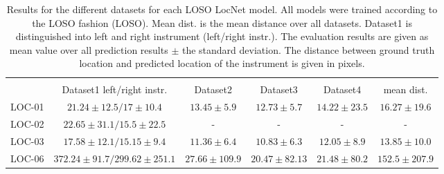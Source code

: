 \begin{table}
\begin{adjustbox}{center=\textwidth}
\begin{tabular}{l c c c c c}
\hline\noalign{\smallskip}
\multicolumn{6}{c}{\textbf{Localization Results Datasets LOSO}} \\
 & Dataset1 left/right instr. & Dataset2 & Dataset3 & Dataset4 & mean dist.\\
\hline\noalign{\smallskip}
LOC-01 & $21.24 \pm 12.5 / 17 \pm 10.4$ & $13.45 \pm 5.9$ & $12.73 \pm 5.7$ & $14.22 \pm 23.5$ & $16.27 \pm 19.6$ \\
LOC-02 & $22.65 \pm 31.1 / 15.5 \pm 22.5$ & - & - & - & - \\
LOC-03 &  $\mathbf{17.58 \pm 12.1 / 15.15 \pm 9.4}$ & $\mathbf{11.36 \pm 6.4}$ & $\mathbf{10.83 \pm 6.3}$ & $\mathbf{12.05 \pm 8.9}$ & $\mathbf{13.85 \pm 10.0}$\\ 
LOC-06 &$372.24 \pm 91.7 / 299.62 \pm 251.1$ & $27.66 \pm 109.9$ & $20.47 \pm 82.13$ & $21.48 \pm 80.2$ & $152.5 \pm 207.9$ \\ [0.5ex] 
\end{tabular}
\end{adjustbox}
\caption[LocNet results leave-one-surgery-out]{Results for the different datasets for each LOSO LocNet model. All models were trained according to the LOSO fashion (LOSO).
Mean dist. is the mean distance over all datasets. Dataset1 is distinguished into left and right instrument (left/right instr.).
The evaluation results are given as mean value over all prediction results $\pm$ the standard deviation. The distance between ground truth location and predicted location of the instrument is given in pixels.}
\label{tab:loc_results_datasets_LOSO}
\end{table}


